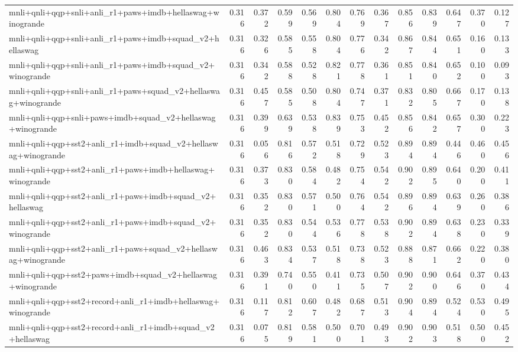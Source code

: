 \begin{table}[t]
\begin{tabular}{lrrrrrrrrrrrr}
    mnli+qnli+qqp+snli+anli\_r1+paws+imdb+hellaswag+winogrande & 0.316 & 0.372 & 0.599 & 0.569 & 0.804 & 0.769 & 0.367 & 0.856 & 0.839 & 0.647 & 0.370 & 0.127 \\
    mnli+qnli+qqp+snli+anli\_r1+paws+imdb+squad\_v2+hellaswag & 0.316 & 0.326 & 0.585 & 0.558 & 0.804 & 0.776 & 0.342 & 0.867 & 0.844 & 0.651 & 0.160 & 0.133 \\
    mnli+qnli+qqp+snli+anli\_r1+paws+imdb+squad\_v2+winogrande & 0.316 & 0.342 & 0.588 & 0.528 & 0.821 & 0.778 & 0.361 & 0.851 & 0.840 & 0.652 & 0.100 & 0.093 \\
    mnli+qnli+qqp+snli+anli\_r1+paws+squad\_v2+hellaswag+winogrande & 0.316 & 0.457 & 0.585 & 0.508 & 0.804 & 0.747 & 0.371 & 0.832 & 0.805 & 0.667 & 0.170 & 0.138 \\
    mnli+qnli+qqp+snli+paws+imdb+squad\_v2+hellaswag+winogrande & 0.316 & 0.399 & 0.639 & 0.538 & 0.839 & 0.753 & 0.452 & 0.856 & 0.842 & 0.657 & 0.300 & 0.223 \\
    mnli+qnli+qqp+sst2+anli\_r1+imdb+squad\_v2+hellaswag+winogrande & 0.316 & 0.056 & 0.816 & 0.572 & 0.518 & 0.729 & 0.523 & 0.894 & 0.894 & 0.446 & 0.460 & 0.456 \\
    mnli+qnli+qqp+sst2+anli\_r1+paws+imdb+hellaswag+winogrande & 0.316 & 0.373 & 0.830 & 0.584 & 0.482 & 0.754 & 0.542 & 0.902 & 0.895 & 0.640 & 0.200 & 0.411 \\
    mnli+qnli+qqp+sst2+anli\_r1+paws+imdb+squad\_v2+hellaswag & 0.316 & 0.352 & 0.830 & 0.571 & 0.500 & 0.764 & 0.542 & 0.896 & 0.894 & 0.639 & 0.260 & 0.386 \\
    mnli+qnli+qqp+sst2+anli\_r1+paws+imdb+squad\_v2+winogrande & 0.316 & 0.352 & 0.830 & 0.544 & 0.536 & 0.778 & 0.538 & 0.902 & 0.894 & 0.638 & 0.230 & 0.339 \\
    mnli+qnli+qqp+sst2+anli\_r1+paws+squad\_v2+hellaswag+winogrande & 0.316 & 0.463 & 0.834 & 0.537 & 0.518 & 0.738 & 0.523 & 0.888 & 0.871 & 0.662 & 0.220 & 0.380 \\
    mnli+qnli+qqp+sst2+paws+imdb+squad\_v2+hellaswag+winogrande & 0.316 & 0.391 & 0.740 & 0.550 & 0.411 & 0.735 & 0.507 & 0.902 & 0.900 & 0.646 & 0.370 & 0.434 \\
    mnli+qnli+qqp+sst2+record+anli\_r1+imdb+hellaswag+winogrande & 0.316 & 0.117 & 0.812 & 0.607 & 0.482 & 0.687 & 0.513 & 0.904 & 0.894 & 0.524 & 0.530 & 0.495 \\
    mnli+qnli+qqp+sst2+record+anli\_r1+imdb+squad\_v2+hellaswag & 0.316 & 0.075 & 0.819 & 0.581 & 0.500 & 0.701 & 0.493 & 0.902 & 0.903 & 0.518 & 0.500 & 0.452 \\

\end{tabular}
\end{table}
